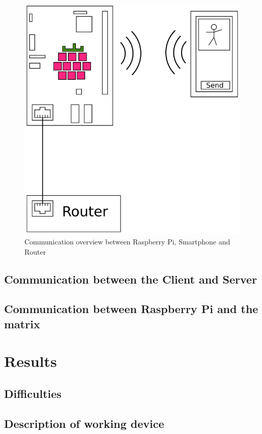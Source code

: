 \documentclass[conference]{IEEEtran}
\begin{document}
\begin{figure}
\label{FIG:COMMUNICATION}
\includegraphics[width=\linewidth]{pics/RasPi-MC}
\caption{Communication overview between Raspberry Pi, Smartphone and Router}
\end{figure}

\subsection{Communication between the Client and Server}


\subsection{Communication between Raspberry Pi and the matrix}


\section{Results}

\subsection{Difficulties}


\subsection{Description of working device}
\end{document}
